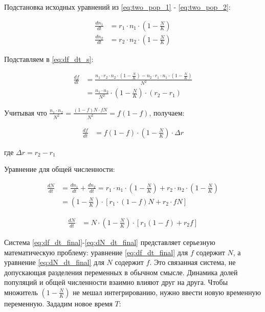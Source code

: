 \documentclass[a4paper, 14pt]{extarticle}
\begin{document}
Подстановка исходных уравнений из \eqref{eq:two_pop_1} - \eqref{eq:two_pop_2}:

\begin{align}
    \frac{dn_1}{dt} &= r_1 \cdot n_1 \cdot \left(1 - \frac{N}{K}\right) \label{eq:dn1_dt_N} \\
    \frac{dn_2}{dt} &= r_2 \cdot n_2 \cdot \left(1 - \frac{N}{K}\right) \label{eq:dn2_dt_N}
\end{align}

Подставляем в \eqref{eq:df_dt_s}:

\begin{align}
    \frac{df}{dt} &= \frac{n_1 \cdot r_2 \cdot n_2 \cdot \left(1 - \frac{N}{K}\right) - n_2 \cdot r_1 \cdot n_1 \cdot \left(1 - \frac{N}{K}\right)}{N^2} \nonumber \\
    &= \frac{n_1 \cdot n_2}{N^2} \cdot \left(1 - \frac{N}{K}\right) \cdot (r_2 - r_1) \label{eq:df_dt_intermediate}
\end{align}

Учитывая что $\frac{n_1 \cdot n_2}{N^2} = \frac{(1-f)N \cdot fN}{N^2} = f(1-f)$, получаем:

\begin{align}
    \frac{df}{dt} &= f(1-f) \cdot \left(1 - \frac{N}{K}\right) \cdot \Delta r \label{eq:df_dt_final}
\end{align}

где $\Delta r = r_2 - r_1$

Уравнение для общей численности:

\begin{align}
    \frac{dN}{dt} &= \frac{dn_1}{dt} + \frac{dn_2}{dt} \nonumber = r_1 \cdot n_1 \cdot \left(1 - \frac{N}{K}\right) + r_2 \cdot n_2 \cdot \left(1 - \frac{N}{K}\right) \nonumber \\
    &= \left(1 - \frac{N}{K}\right) \cdot [r_1 \cdot (1-f)N + r_2 \cdot fN] \nonumber
\end{align}

\begin{align}
    \frac{dN}{dt} &= N \cdot \left(1 - \frac{N}{K}\right) \cdot [r_1(1-f) + r_2 f] \label{eq:dN_dt_final}
\end{align}

Система \eqref{eq:df_dt_final}-\eqref{eq:dN_dt_final} представляет серьезную математическую проблему: уравнение \eqref{eq:df_dt_final} для $f$ содержит $N$, а уравнение \eqref{eq:dN_dt_final} для $N$ содержит $f$. Это связанная система, не допускающая разделения переменных в обычном смысле. Динамика долей популяций и общей численности взаимно влияют друг на друга. Чтобы множитель $\left(1 - \frac{N}{K}\right)$ не мешал интегрированию, нужно ввести новую временную переменную. Зададим новое время $T$:
\end{document}
